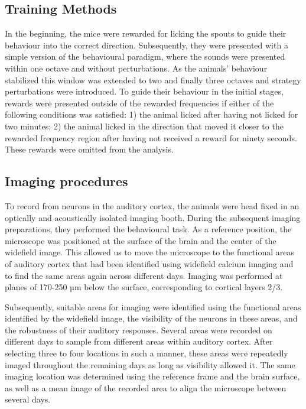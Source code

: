 \documentclass[]{report}
\theoremstyle{definition}
\theoremstyle{definition}
\theoremstyle{definition}
\theoremstyle{remark}
\begin{document}
\hypertarget{training-methods}{%
\subsection{Training Methods}\label{training-methods}}

In the beginning, the mice were rewarded for licking the spouts to guide
their behaviour into the correct direction. Subsequently, they were
presented with a simple version of the behavioural paradigm, where the
sounds were presented within one octave and without perturbations. As
the animals' behaviour stabilized this window was extended to two and
finally three octaves and strategy perturbations were introduced. To
guide their behaviour in the initial stages, rewards were presented
outside of the rewarded frequencies if either of the following
conditions was satisfied: 1) the animal licked after having not licked
for two minutes; 2) the animal licked in the direction that moved it
closer to the rewarded frequency region after having not received a
reward for ninety seconds. These rewards were omitted from the analysis.

\hypertarget{imaging-procedures-1}{%
\subsection{Imaging procedures}\label{imaging-procedures-1}}

To record from neurons in the auditory cortex, the animals were head
fixed in an optically and acoustically isolated imaging booth. During
the subsequent imaging preparations, they performed the behavioural
task. As a reference position, the microscope was positioned at the
surface of the brain and the center of the widefield image. This allowed
us to move the microscope to the functional areas of auditory cortex
that had been identified using widefield calcium imaging and to find the
same areas again across different days. Imaging was performed at planes
of 170-250 µm below the surface, corresponding to cortical layers 2/3.

Subsequently, suitable areas for imaging were identified using the
functional areas identified by the widefield image, the visibility of
the neurons in these areas, and the robustness of their auditory
responses. Several areas were recorded on different days to sample from
different areas within auditory cortex. After selecting three to four
locations in such a manner, these areas were repeatedly imaged
throughout the remaining days as long as visibility allowed it. The same
imaging location was determined using the reference frame and the brain
surface, as well as a mean image of the recorded area to align the
microscope between several days.
\end{document}
